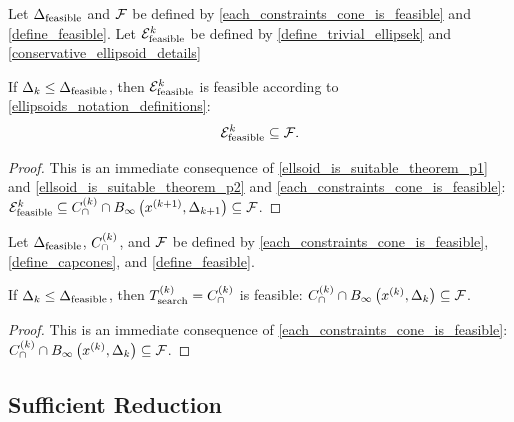 \begin{lemma}
\label{ellipsoid_is_feasible}
Let ${\Delta_{\textrm{feasible}}}$ and ${\mathcal F}$
be defined by
\cref{each_constraints_cone_is_feasible} and
\cref{define_feasible}.
Let ${\mathcal E^k_{\textrm{feasible}}}$ be defined by \cref{define_trivial_ellipsek} and \cref{conservative_ellipsoid_details}



If $\Delta_k \le {\Delta_{\textrm{feasible}}}$, then ${\mathcal E^k_{\textrm{feasible}}}$ is feasible according to \cref{ellipsoids_notation_definitions}:
\begin{align*}
{\mathcal E^k_{\textrm{feasible}}} \subseteq {\mathcal F}.
\end{align*}
\end{lemma}

\begin{proof}
This is an immediate consequence of \cref{ellsoid_is_suitable_theorem_p1} and \cref{ellsoid_is_suitable_theorem_p2} and \cref{each_constraints_cone_is_feasible}:
${\mathcal E^k_{\textrm{feasible}}} \subseteq {C^{(k)}_{\cap}} \cap { B_{\infty}\left({{x}^{(k+1)}}, \Delta_{k+1}\right) } \subseteq {\mathcal F}$.
\end{proof}



\begin{lemma}
\label{searchtrk_is_feasible}
Let ${\Delta_{\textrm{feasible}}}$, ${C^{(k)}_{\cap}}$, and ${\mathcal F}$
be defined by
\cref{each_constraints_cone_is_feasible},
\cref{define_capcones},
and
\cref{define_feasible}.



If $\Delta_k \le {\Delta_{\textrm{feasible}}}$, then ${T_{\text{search}}^{(k)}} = {C^{(k)}_{\cap}}$ is feasible:
${C^{(k)}_{\cap}} \cap { B_{\infty}\left(x^{(k)}, \Delta_k\right) } \subseteq {\mathcal F}$.
\end{lemma}

\begin{proof}
This is an immediate consequence of \cref{each_constraints_cone_is_feasible}:
${C^{(k)}_{\cap}} \cap { B_{\infty}\left(x^{(k)}, \Delta_k\right) } \subseteq {\mathcal F}$.
\end{proof}






\subsection{Sufficient Reduction}
\label{sufficient_reduction_section}

